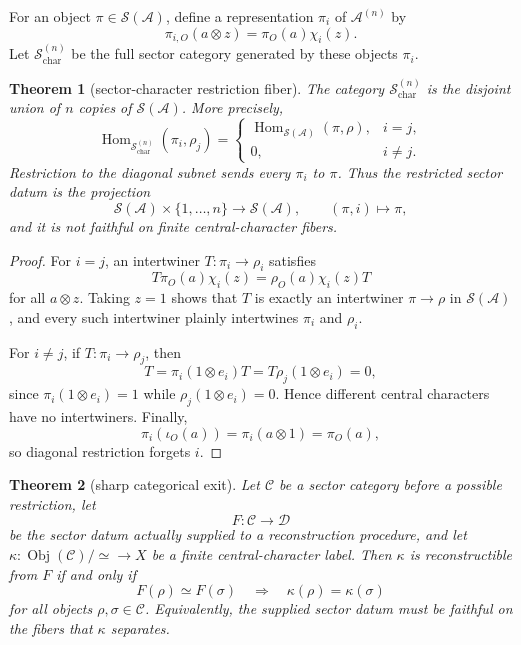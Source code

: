 \documentclass[12pt]{article}
\newtheorem{theorem}{Theorem}
\theoremstyle{remark}
\newcommand{\A}{\mathcal A}
\newcommand{\D}{\mathcal D}
\newcommand{\Hom}{\operatorname{Hom}}
\newcommand{\Obj}{\operatorname{Obj}}
\newcommand{\Sectors}{\mathcal S}
\begin{document}
For an object \(\pi\in\Sectors(\A)\), define a representation \(\pi_i\) of
\(\A^{(n)}\) by
\[
  \pi_{i,O}(a\otimes z)=\pi_O(a)\chi_i(z).
\]
Let \(\Sectors_{\mathrm{char}}^{(n)}\) be the full sector category generated
by these objects \(\pi_i\).

\begin{theorem}[sector-character restriction fiber]
\label{thm:sector-character-fiber}
The category \(\Sectors_{\mathrm{char}}^{(n)}\) is the disjoint union of \(n\)
copies of \(\Sectors(\A)\).  More precisely,
\[
  \Hom_{\Sectors_{\mathrm{char}}^{(n)}}(\pi_i,\rho_j)
  =
  \begin{cases}
    \Hom_{\Sectors(\A)}(\pi,\rho),& i=j,\\
    0,& i\ne j.
  \end{cases}
\]
Restriction to the diagonal subnet sends every \(\pi_i\) to \(\pi\).  Thus the
restricted sector datum is the projection
\[
  \Sectors(\A)\times\{1,\ldots,n\}\longrightarrow \Sectors(\A),
  \qquad (\pi,i)\longmapsto\pi,
\]
and it is not faithful on finite central-character fibers.
\end{theorem}

\begin{proof}
For \(i=j\), an intertwiner \(T:\pi_i\to\rho_i\) satisfies
\[
  T\pi_O(a)\chi_i(z)=\rho_O(a)\chi_i(z)T
\]
for all \(a\otimes z\).  Taking \(z=1\) shows that \(T\) is exactly an
intertwiner \(\pi\to\rho\) in \(\Sectors(\A)\), and every such intertwiner
plainly intertwines \(\pi_i\) and \(\rho_i\).

For \(i\ne j\), if \(T:\pi_i\to\rho_j\), then
\[
  T=\pi_i(1\otimes e_i)T=T\rho_j(1\otimes e_i)=0,
\]
since \(\pi_i(1\otimes e_i)=1\) while \(\rho_j(1\otimes e_i)=0\).  Hence
different central characters have no intertwiners.  Finally,
\[
  \pi_i(\iota_O(a))=\pi_i(a\otimes1)=\pi_O(a),
\]
so diagonal restriction forgets \(i\).
\end{proof}

\begin{theorem}[sharp categorical exit]
\label{thm:sharp-exit}
Let \(\mathcal C\) be a sector category before a possible restriction, let
\[
  F:\mathcal C\to\D
\]
be the sector datum actually supplied to a reconstruction procedure, and let
\(\kappa:\Obj(\mathcal C)/{\simeq}\to X\) be a finite central-character label.
Then \(\kappa\) is reconstructible from \(F\) if and only if
\[
  F(\rho)\simeq F(\sigma)\quad\Longrightarrow\quad
  \kappa(\rho)=\kappa(\sigma)
  \tag{1}
\]
for all objects \(\rho,\sigma\in\mathcal C\).  Equivalently, the supplied
sector datum must be faithful on the fibers that \(\kappa\) separates.
\end{theorem}
\end{document}
